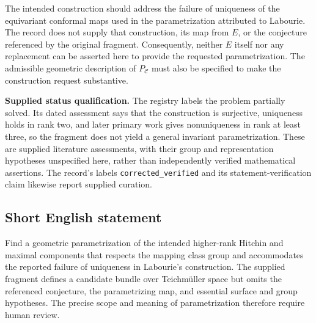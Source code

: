 \documentclass[11pt]{article}
\begin{document}
The intended construction should address the failure of uniqueness of the equivariant conformal maps used in the parametrization attributed to Labourie. The record does not supply that construction, its map from \(E\), or the conjecture referenced by the original fragment. Consequently, neither \(E\) itself nor any replacement can be asserted here to provide the requested parametrization. The admissible geometric description of \(P_{\mathcal C}\) must also be specified to make the construction request substantive.

\textbf{Supplied status qualification.} The registry labels the problem partially solved. Its dated assessment says that the construction is surjective, uniqueness holds in rank two, and later primary work gives nonuniqueness in rank at least three, so the fragment does not yield a general invariant parametrization. These are supplied literature assessments, with their group and representation hypotheses unspecified here, rather than independently verified mathematical assertions. The record's labels \texttt{corrected\_verified} and its statement-verification claim likewise report supplied curation.
\subsection{Short English statement}
Find a geometric parametrization of the intended higher-rank Hitchin and maximal components that respects the mapping class group and accommodates the reported failure of uniqueness in Labourie's construction. The supplied fragment defines a candidate bundle over Teichm\"uller space but omits the referenced conjecture, the parametrizing map, and essential surface and group hypotheses. The precise scope and meaning of parametrization therefore require human review.
\end{document}
